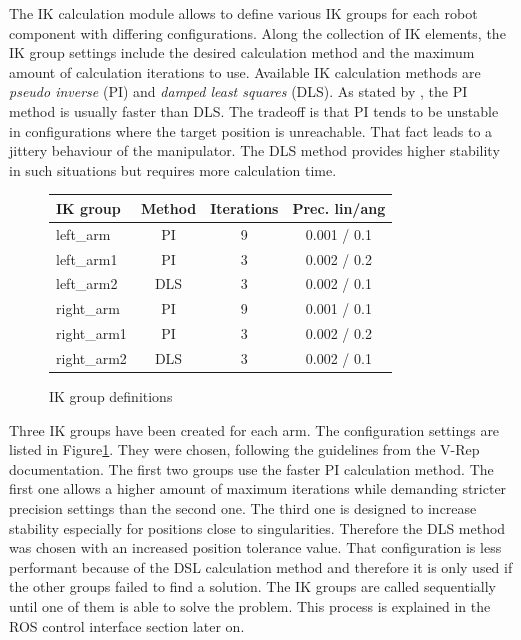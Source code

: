 The IK calculation module allows to define various IK groups for each robot component with differing configurations. Along the collection of IK elements, the IK group settings include the desired calculation method and the maximum amount of calculation iterations to use. Available IK calculation methods are \emph{pseudo inverse} (PI) and \emph{damped least squares} (DLS). As stated by \cite{buss2004}, the PI method is usually faster than DLS. The tradeoff is that PI tends to be unstable in configurations where the target position is unreachable. That fact leads to a jittery behaviour of the manipulator. The DLS method provides higher stability in such situations but requires more calculation time.

\begin{figure}[h]
  \centering
  \label{fig:ik_defs}
  \begin{tabular}[h]{|l|c|c|c|} \hline
	\textbf{IK group} & \textbf{Method} & \textbf{Iterations} & \textbf{Prec. lin/ang} \\ \hline
	left\_arm & PI & 9 & 0.001 / 0.1  \\
	left\_arm1 & PI & 3 & 0.002 / 0.2  \\
	left\_arm2 & DLS & 3 & 0.002 / 0.1  \\
	right\_arm & PI & 9 & 0.001 / 0.1  \\
	right\_arm1 & PI & 3 & 0.002 / 0.2  \\
	right\_arm2 & DLS & 3 & 0.002 / 0.1  \\ \hline
  \end{tabular}
  \caption{IK group definitions}
\end{figure}

Three IK groups have been created for each arm. The configuration settings are listed in Figure\ref{fig:ik_defs}. They were chosen, following the guidelines from the V-Rep documentation. The first two groups use the faster PI calculation method. The first one allows a higher amount of maximum iterations while demanding stricter precision settings than the second one. The third one is designed to increase stability especially for positions close to singularities. Therefore the DLS method was chosen with an increased position tolerance value. That configuration is less performant because of the DSL calculation method and therefore it is only used if the other groups failed to find a solution. The IK groups are called sequentially until one of them is able to solve the problem. This process is explained in the ROS control interface section later on.

